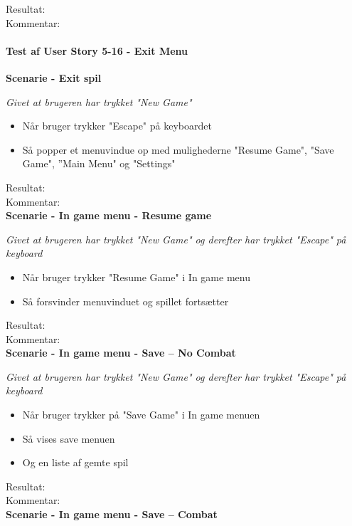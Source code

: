 Resultat:\\
Kommentar:\\

\paragraph{Test af User Story 5-16 - Exit Menu}

\bf{Scenarie - Exit spil}

\it{Givet at brugeren har trykket "New Game"}

\begin{itemize}
  \item Når bruger trykker "Escape" på keyboardet
  \item Så popper et menuvindue op med mulighederne "Resume Game", "Save Game", ”Main Menu" og "Settings"
\end{itemize}

Resultat:\\
Kommentar:\\

\bf{Scenarie - In game menu - Resume game}

\it{Givet at brugeren har trykket "New Game" og derefter har trykket "Escape" på keyboard}

\begin{itemize}
  \item Når bruger trykker "Resume Game" i In game menu
  \item Så forsvinder menuvinduet og spillet fortsætter
\end{itemize}

Resultat:\\
Kommentar:\\

\bf{Scenarie - In game menu - Save -- No Combat}

\it{Givet at brugeren har trykket "New Game" og derefter har trykket "Escape" på keyboard}

\begin{itemize}
  \item Når bruger trykker på "Save Game" i In game menuen
  \item Så vises save menuen
  \item Og en liste af gemte spil
\end{itemize}

Resultat:\\
Kommentar:\\

\bf{Scenarie - In game menu - Save -- Combat}


